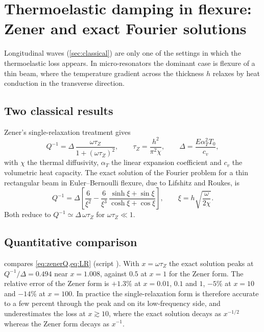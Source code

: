 \section{Thermoelastic damping in flexure: Zener and exact Fourier solutions}\label{sec:flexted}

Longitudinal waves (\cref{sec:classical}) are only one of the settings in which the thermoelastic loss appears. In micro-resonators the dominant case is flexure of a thin beam, where the temperature gradient across the thickness $h$ relaxes by heat conduction in the transverse direction.

\subsection{Two classical results}
Zener's single-relaxation treatment gives
\begin{equation}\label{eq:zenerQ}
Q^{-1}=\Delta\,\frac{\omega\tau_Z}{1+(\omega\tau_Z)^2},\qquad \tau_Z=\frac{h^2}{\pi^2\chi},\qquad \Delta=\frac{E\alpha_T^2T_0}{c_v},
\end{equation}
with $\chi$ the thermal diffusivity, $\alpha_T$ the linear expansion coefficient and $c_v$ the volumetric heat capacity. The exact solution of the Fourier problem for a thin rectangular beam in Euler--Bernoulli flexure, due to Lifshitz and Roukes, is
\begin{equation}\label{eq:LR}
Q^{-1}=\Delta\left[\frac{6}{\xi^{2}}-\frac{6}{\xi^{3}}\,\frac{\sinh\xi+\sin\xi}{\cosh\xi+\cos\xi}\right],\qquad \xi=h\sqrt{\frac{\omega}{2\chi}} .
\end{equation}
Both reduce to $Q^{-1}\simeq\Delta\,\omega\tau_Z$ for $\omega\tau_Z\ll1$.

\subsection{Quantitative comparison}
 compares \cref{eq:zenerQ,eq:LR} (script ). With $x=\omega\tau_Z$ the exact solution peaks at $Q^{-1}/\Delta=0.494$ near $x=1.008$, against $0.5$ at $x=1$ for the Zener form. The relative error of the Zener form is $+1.3\%$ at $x=0.01$, $0.1$ and $1$, $-5\%$ at $x=10$ and $-14\%$ at $x=100$. In practice the single-relaxation form is therefore accurate to a few percent through the peak and on its low-frequency side, and underestimates the loss at $x\gtrsim10$, where the exact solution decays as $x^{-1/2}$ whereas the Zener form decays as $x^{-1}$.

